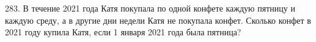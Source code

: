 283. В течение 2021 года Катя покупала по одной конфете каждую пятницу и каждую среду, а в другие дни недели Катя не покупала конфет. Сколько конфет в 2021 году купила Катя, если 1 января 2021 года была пятница?\\
